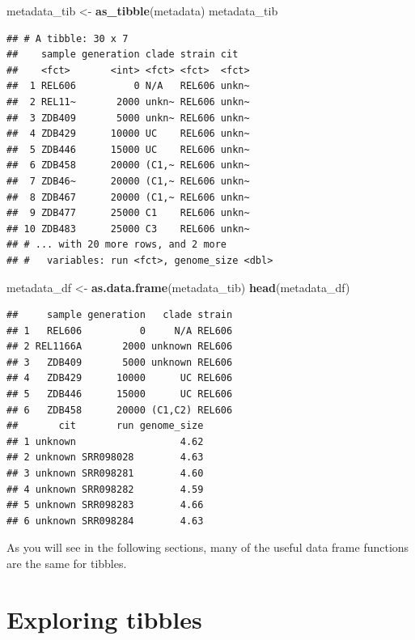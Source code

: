 \documentclass[]{book}
\newenvironment{Shaded}{\begin{snugshade}}{\end{snugshade}}
\newcommand{\KeywordTok}[1]{\textcolor[rgb]{0.13,0.29,0.53}{\textbf{#1}}}
\newcommand{\NormalTok}[1]{#1}
\newcommand{\StringTok}[1]{\textcolor[rgb]{0.31,0.60,0.02}{#1}}
\begin{document}
\begin{Shaded}
\begin{Highlighting}[]
\NormalTok{metadata_tib <-}\StringTok{ }\KeywordTok{as_tibble}\NormalTok{(metadata)}
\NormalTok{metadata_tib}
\end{Highlighting}
\end{Shaded}

\begin{verbatim}
## # A tibble: 30 x 7
##    sample generation clade strain cit  
##    <fct>       <int> <fct> <fct>  <fct>
##  1 REL606          0 N/A   REL606 unkn~
##  2 REL11~       2000 unkn~ REL606 unkn~
##  3 ZDB409       5000 unkn~ REL606 unkn~
##  4 ZDB429      10000 UC    REL606 unkn~
##  5 ZDB446      15000 UC    REL606 unkn~
##  6 ZDB458      20000 (C1,~ REL606 unkn~
##  7 ZDB46~      20000 (C1,~ REL606 unkn~
##  8 ZDB467      20000 (C1,~ REL606 unkn~
##  9 ZDB477      25000 C1    REL606 unkn~
## 10 ZDB483      25000 C3    REL606 unkn~
## # ... with 20 more rows, and 2 more
## #   variables: run <fct>, genome_size <dbl>
\end{verbatim}

\begin{Shaded}
\begin{Highlighting}[]
\NormalTok{metadata_df <-}\StringTok{ }\KeywordTok{as.data.frame}\NormalTok{(metadata_tib)}
\KeywordTok{head}\NormalTok{(metadata_df)}
\end{Highlighting}
\end{Shaded}

\begin{verbatim}
##     sample generation   clade strain
## 1   REL606          0     N/A REL606
## 2 REL1166A       2000 unknown REL606
## 3   ZDB409       5000 unknown REL606
## 4   ZDB429      10000      UC REL606
## 5   ZDB446      15000      UC REL606
## 6   ZDB458      20000 (C1,C2) REL606
##       cit       run genome_size
## 1 unknown                  4.62
## 2 unknown SRR098028        4.63
## 3 unknown SRR098281        4.60
## 4 unknown SRR098282        4.59
## 5 unknown SRR098283        4.66
## 6 unknown SRR098284        4.63
\end{verbatim}

As you will see in the following sections, many of the useful data frame functions are the same for tibbles.

\hypertarget{exploring-tibbles}{%
\section{Exploring tibbles}\label{exploring-tibbles}}
\end{document}
